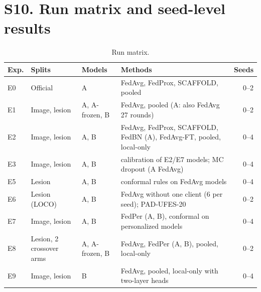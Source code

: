\documentclass[10pt]{article}
\begin{document}
\section*{S10. Run matrix and seed-level results}
\begin{table}[!htbp]
\centering
\footnotesize
\caption{Run matrix.}
\label{tab:s10runs}
\begin{tabular}{@{}llllr@{}}
\toprule
Exp. & Splits & Models & Methods & Seeds \\
\midrule
E0 & Official & A & FedAvg, FedProx, SCAFFOLD, pooled & 0--2 \\
E1 & Image, lesion & A, A-frozen, B & FedAvg, pooled (A: also FedAvg 27 rounds) & 0--2 \\
E2 & Image, lesion & A, B & FedAvg, FedProx, SCAFFOLD, FedBN (A), FedAvg-FT, pooled, local-only & 0--4 \\
E3 & Image, lesion & A, B & calibration of E2/E7 models; MC dropout (A FedAvg) & 0--4 \\
E5 & Lesion & A, B & conformal rules on FedAvg models & 0--4 \\
E6 & Lesion (LOCO) & A, B & FedAvg without one client (6 per seed); PAD-UFES-20 & 0--2 \\
E7 & Image, lesion & A, B & FedPer (A, B), conformal on personalized models & 0--4 \\
E8 & Lesion, 2 crossover arms & A, A-frozen, B & FedAvg, FedPer (A, B), pooled, local-only & 0--2 \\
E9 & Image, lesion & B & FedAvg, pooled, local-only with two-layer heads & 0--4 \\
\bottomrule
\end{tabular}
\end{table}
\end{document}
